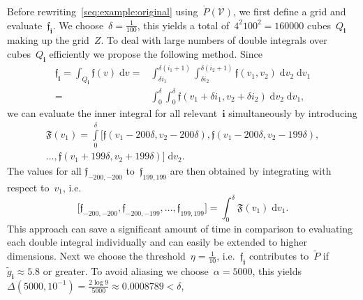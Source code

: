 \documentclass[letterpaper, 10pt, conference]{ieeeconf} %
\providecommand{\bfa}[1]{\mathbf{#1}}
\begin{document}
%
Before rewriting~\eqref{seq:example:original} using~$\mathring P(\mathcal V)$, we first define a grid and evaluate~$\mathfrak f_\bfa{i}$.
%
We choose~$\delta=\frac{1}{100}$, this yields a total of~$4^2 100^2=160000$ cubes~$Q_\bfa{i}$ making up the grid~$Z$.
%
To deal with large numbers of double integrals over cubes~$Q_\bfa{i}$ efficiently we propose the following method.
%
Since
\begin{align*}
\mathfrak f_\bfa{i}=\int_{Q_\bfa{i}}\mathfrak f(v) \; \mathrm d v = &\int_{\delta i_1}^{\delta(i_1+1)}\int_{\delta i_2}^{\delta(i_2+1)}\mathfrak f(v_1,v_2) \; \mathrm d v_2 \; \mathrm d v_1 \\
= &\int_0^\delta\int_0^\delta \mathfrak f(v_1+\delta i_1,v_2+\delta i_2) \; \mathrm d v_2 \; \mathrm d v_1 ,
\end{align*}
we can evaluate the inner integral for all relevant~$\bfa{i}$ simultaneously by introducing
%
\begin{multline*}
\mathfrak F(v_1) =
\int\limits_0^\delta 
\bigl[ 
\mathfrak f(v_1-200\delta,v_2-200\delta) , \mathfrak f(v_1-200\delta,v_2-199\delta), \\
\ldots, \mathfrak f(v_1+199\delta,v_2+199\delta) \bigr] \; \mathrm d v_2 .
\end{multline*}
%
The values for all $\mathfrak f_{-200,-200}$ to~$\mathfrak f_{199,199}$ are then obtained by integrating with respect to~$v_1$, i.e. 
\[
\bigl[ \mathfrak f_{-200,-200}, \mathfrak f_{-200,-199},\dots,\mathfrak f_{199,199} \bigr] =\int_0^\delta\mathfrak F(v_1) \; \mathrm d v_1.
\]
%
This approach can save a significant amount of time in comparison to evaluating each double integral individually and can easily be extended to higher dimensions.
%
Next we choose the threshold~$\eta=\frac{1}{10}$, i.e.~$\mathfrak f_\bfa{i}$ contributes to~$\tilde{P}$ if~$\tilde g_\bfa{i}\approx5.8$ or greater.
%
To avoid aliasing we choose~$\alpha=5000$, this yields~$\Delta(5000,10^{-1}) = \frac{2\log9}{5000}\approx0.0008789<\delta$,
%
\end{document}

